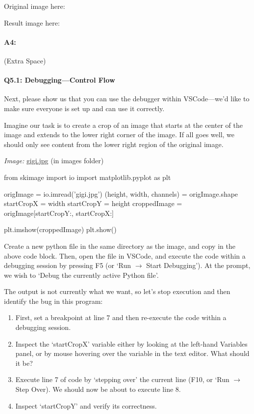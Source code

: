 \documentclass[11pt]{article}
\begin{document}
Original image here:

Result image here:

\pagebreak
\paragraph{A4:} (Extra Space)




\pagebreak
\paragraph{Q5.1: Debugging---Control Flow} Next, please show us that you can use the debugger within VSCode---we'd like to make sure everyone is set up and can use it correctly. 

Imagine our task is to create a crop of an image that starts at the center of the image and extends to the lower right corner of the image. If all goes well, we should only see content from the lower right region of the original image.

\emph{Image:} \href{images/gigi.jpg}{gigi.jpg} (in images folder)

\begin{python}
from skimage import io
import matplotlib.pyplot as plt

origImage = io.imread('gigi.jpg')
(height, width, channels) = origImage.shape
startCropX = width %
startCropY = height %
croppedImage = origImage[startCropY:, startCropX:]

plt.imshow(croppedImage)
plt.show()
\end{python}

Create a new python file in the same directory as the image, and copy in the above code block. Then, open the file in VSCode, and execute the code within a debugging session by pressing F5 (or `Run $\rightarrow$ Start Debugging'). At the prompt, we wish to `Debug the currently active Python file'.

The output is not currently what we want, so let's stop execution and then identify the bug in this program:
\begin{enumerate}
    \item First, set a breakpoint at line 7 and then re-execute the code within a debugging session.
    \item Inspect the `startCropX' variable either by looking at the left-hand Variables panel, or by mouse hovering over the variable in the text editor. What should it be?
    \item Execute line 7 of code by `stepping over' the current line (F10, or `Run $\rightarrow$ Step Over). We should now be about to execute line 8.
    \item Inspect `startCropY' and verify its correctness.
\end{enumerate}
\end{document}
